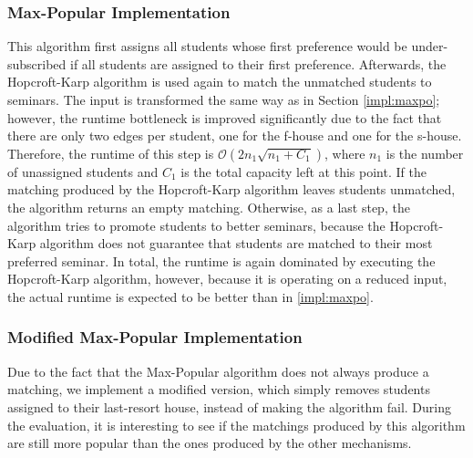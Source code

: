 \subsubsection{Max-Popular Implementation}
This algorithm first assigns all students whose first preference would be under-subscribed if all students are assigned to their first preference. Afterwards, the Hopcroft-Karp algorithm is used again to match the unmatched students to seminars. The input is transformed the same way as in Section \ref{impl:maxpo}; however, the runtime bottleneck is improved significantly due to the fact that there are only two edges per student, one for the f-house and one for the s-house. Therefore, the runtime of this step is $\mathcal{O}(2n_1\sqrt{n_1+C_1})$, where $n_1$ is the number of unassigned students and $C_1$ is the total capacity left at this point. If the matching produced by the Hopcroft-Karp algorithm leaves students unmatched, the algorithm returns an empty matching. Otherwise, as a last step, the algorithm tries to promote students to better seminars, because the Hopcroft-Karp algorithm does not guarantee that students are matched to their most preferred seminar. In total, the runtime is again dominated by executing the Hopcroft-Karp algorithm, however, because it is operating on a reduced input, the actual runtime is expected to be better than in \ref{impl:maxpo}.

\subsubsection{Modified Max-Popular Implementation}\label{impl:mod-max-pop}
Due to the fact that the Max-Popular algorithm does not always produce a matching, we implement a modified version, which simply removes students assigned to their last-resort house, instead of making the algorithm fail. During the evaluation, it is interesting to see if the matchings produced by this algorithm are still more popular than the ones produced by the other mechanisms.


